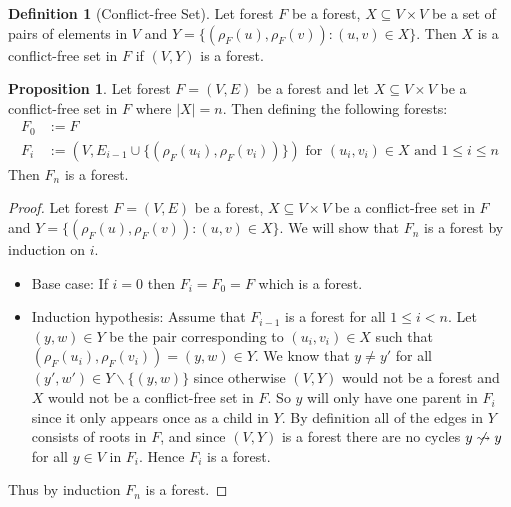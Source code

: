\documentclass[a4paper,12pt]{article}
\theoremstyle{definition}
\newtheorem{definition}{Definition}[section]
\newtheorem{proposition}{Proposition}[section]
\begin{document}
\begin{definition}[Conflict-free Set]
    Let forest $F$ be a forest, $X \subseteq V \times V$ be a set of pairs of
    elements in $V$ and $Y = \{(\rho_F(u), \rho_F(v)) : (u, v) \in X\}$. Then
    $X$ is a conflict-free set in $F$ if $(V, Y)$ is a forest.
\end{definition}

\begin{proposition}
    Let forest $F = (V, E)$ be a forest and let $X \subseteq V \times V$ be a
    conflict-free set in $F$ where $|X| = n$. Then defining the following forests:
    \begin{align*}
        F_0 &:= F \\
        F_{i} &:= (V, E_{i - 1} \cup \{(\rho_F(u_i), \rho_F(v_i))\}) \text{ for } (u_i, v_i) \in X \text{ and } 1 \leq i \leq n
    \end{align*}
    Then $F_n$ is a forest.
\end{proposition}

\begin{proof}
    Let forest $F = (V, E)$ be a forest, $X \subseteq V \times V$ be a
    conflict-free set in $F$ and $Y = \{(\rho_F(u), \rho_F(v)) : (u, v) \in
    X\}$. We will show that $F_n$ is a forest by induction on $i$.
    \begin{itemize}
        \item Base case: If $i = 0$ then $F_i = F_0 = F$ which is a forest.
        \item Induction hypothesis: Assume that $F_{i - 1}$ is a forest for all
        $1 \leq i < n$.  Let $(y, w) \in Y$ be the pair corresponding to $(u_i,
        v_i) \in X$ such that  $(\rho_F(u_i), \rho_F(v_i)) = (y, w) \in Y$. We
        know that $y \neq y'$ for all  $(y', w') \in Y \backslash \{(y, w)\}$
        since otherwise $(V, Y)$ would not be a forest and $X$ would not be a
        conflict-free set in $F$. So $y$ will only have one parent in $F_i$
        since it only appears once as a child in $Y$. By definition all of the
        edges in $Y$ consists of roots in $F$, and since $(V, Y)$ is a forest
        there are no cycles $y \centernot\leadsto y$ for all $y \in V$ in $F_i$.
        Hence $F_i$ is a forest.
    \end{itemize}
    Thus by induction $F_n$ is a forest.
\end{proof}
\end{document}
